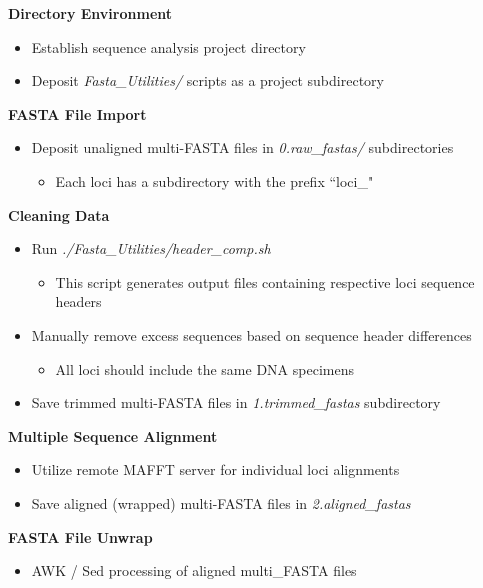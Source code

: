 \begin{seqlist}
\item{\textbf{Directory Environment}}
\begin{itemize}
\item{Establish sequence analysis project directory}
\item{Deposit \textit{Fasta\_Utilities/} scripts as a project subdirectory}
\end{itemize}

\item{\textbf{FASTA File Import}}
\begin{itemize}
\item{Deposit unaligned multi-FASTA files in \textit{0.raw\_fastas/} subdirectories}
\begin{itemize}
\item{Each loci has a subdirectory with the prefix ``loci\_"}
\end{itemize}
\end{itemize}

\item{\textbf{Cleaning Data}}
\begin{itemize}
\item{Run \textit{./Fasta\_Utilities/header\_comp.sh}}
\begin{itemize}
\item{This script generates output files containing respective loci sequence headers}
\end{itemize}
\item{Manually remove excess sequences based on sequence header differences}
\begin{itemize}
\item{All loci should include the same DNA specimens}
\end{itemize}
\item{Save trimmed multi-FASTA files in \textit{1.trimmed\_fastas} subdirectory}
\end{itemize}

\item{\textbf{Multiple Sequence Alignment}}
\begin{itemize}
\item{Utilize remote MAFFT server for individual loci alignments}
\item{Save aligned (wrapped) multi-FASTA files in \textit{2.aligned\_fastas}}
\end{itemize}

\item{\textbf{FASTA File Unwrap}}
\begin{itemize}
\item{AWK / Sed processing of aligned multi\_FASTA files}
\end{itemize}


\end{seqlist}
